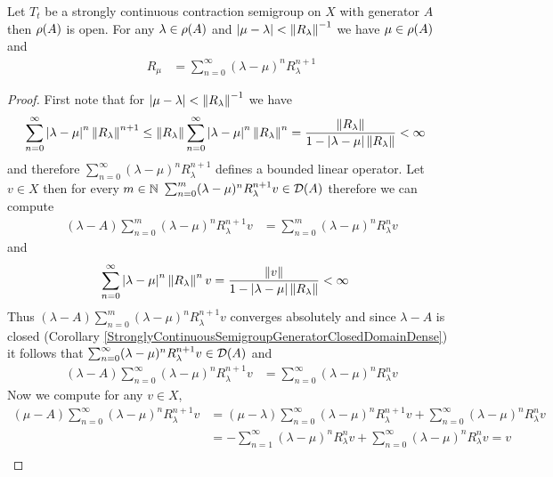 \begin{prop}\label{SCCSResolventSetOpen}Let $T_t$ be a strongly continuous contraction semigroup on $X$ with generator $A$ then $\rho(A)$ is open.  For any $\lambda \in \rho(A)$ and 
$\left \vert \mu - \lambda \right \vert < \left \lVert R_\lambda \right \rVert^{-1}$ we have $\mu \in \rho(A)$ and 
\begin{align*}
R_\mu &= \sum_{n=0}^\infty (\lambda - \mu)^n R_\lambda^{n+1}
\end{align*}
\end{prop}
\begin{proof}
First note that for $\left \vert \mu - \lambda \right \vert < \left \lVert R_\lambda \right \rVert^{-1}$ we have
\begin{align*}
\sum_{n=0}^\infty \left \vert \lambda - \mu \right \vert^n \left \lVert R_\lambda \right \rVert^{n+1} 
&\leq \left \lVert R_\lambda \right \rVert \sum_{n=0}^\infty \left \vert \lambda - \mu \right \vert^n \left \lVert R_\lambda \right \rVert^{n} 
= \frac{\left \lVert R_\lambda \right \rVert}{1 - \left \vert \lambda - \mu \right \vert \left \lVert R_\lambda \right \rVert}
< \infty
\end{align*} 
and therefore $\sum_{n=0}^\infty (\lambda - \mu)^n R_\lambda^{n+1}$ defines a bounded linear operator.  Let $v \in X$ then for every $m \in \mathbb{N}$
$\sum_{n=0}^m  (\lambda - \mu)^n R_\lambda^{n+1} v \in \mathcal{D}(A)$ therefore we can compute
\begin{align*}
(\lambda - A) \sum_{n=0}^m  (\lambda - \mu)^n R_\lambda^{n+1} v
&= \sum_{n=0}^m  (\lambda - \mu)^n R_\lambda^{n} v
\end{align*}
and 
\begin{align*}
\sum_{n=0}^\infty \left \vert \lambda - \mu \right \vert^n \left \lVert R_\lambda \right \rVert^{n} v &= \frac{\left \lVert v \right \rVert}{1 - \left \vert \lambda - \mu \right \vert \left \lVert R_\lambda \right \rVert} < \infty
\end{align*}
Thus $(\lambda - A) \sum_{n=0}^m  (\lambda - \mu)^n R_\lambda^{n+1} v$ converges absolutely and since $\lambda -A$ is closed
(Corollary \ref{StronglyContinuousSemigroupGeneratorClosedDomainDense}) it follows that $\sum_{n=0}^\infty  (\lambda - \mu)^n R_\lambda^{n+1} v \in \mathcal{D}(A)$ and
\begin{align*}
(\lambda -A) \sum_{n=0}^\infty  (\lambda - \mu)^n R_\lambda^{n+1}v  &= \sum_{n=0}^\infty  (\lambda - \mu)^n R_\lambda^{n} v
\end{align*}
Now we compute for any $v \in X$,
\begin{align*}
(\mu - A) \sum_{n=0}^\infty  (\lambda - \mu)^n R_\lambda^{n+1} v
&= (\mu - \lambda) \sum_{n=0}^\infty  (\lambda - \mu)^n R_\lambda^{n+1} v + \sum_{n=0}^\infty  (\lambda - \mu)^n R_\lambda^{n} v\\
&= -\sum_{n=1}^\infty  (\lambda - \mu)^n R_\lambda^{n} v + \sum_{n=0}^\infty  (\lambda - \mu)^n R_\lambda^{n} v  = v\\

\end{align*}
\end{proof}
